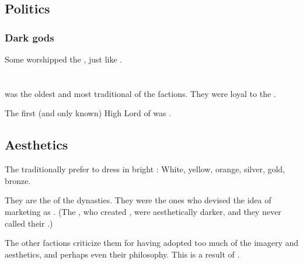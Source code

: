 \subsection{Politics}





\subsubsection{Dark gods}
Some \Baelzerach{} worshipped the , just like . 















\section{\CiriathSepher}
\index{\CiriathSepher}
\KiriathSepher{} was the oldest and most traditional of the \resphan{} factions. 
They were loyal to the \banes. 

The first (and only known) High Lord of \KiriathSepher{} was . 









\subsection{Aesthetics}
The \CiriathSepher{} traditionally prefer to dress in bright \colours: 
White, yellow, orange, silver, gold, bronze. 

They are the  of the dynasties. 
They were the ones who devised the idea of marketing \Iquin{} as . 
(The \Kezeradi{}, who created \Iquin, were aesthetically darker, and they never called their \dweomer{} .) 

The other factions criticize them for having adopted too much of the \Merkyran{} imagery and aesthetics, and perhaps even their philosophy. This is a result of .





